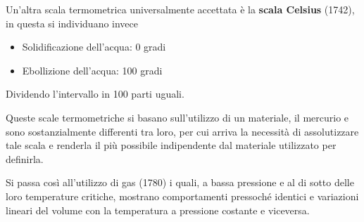 \documentclass[a4paper, 15pt]{article}
\begin{document}
\begin{adjustwidth}{2in}{}
	Un'altra scala termometrica universalmente accettata è la \textbf{scala Celsius} (1742), in questa si individuano invece
	\begin{itemize}
		\item Solidificazione dell'acqua: 0 gradi
		\item Ebollizione dell'acqua: 100 gradi
	\end{itemize}
	Dividendo l'intervallo in 100 parti uguali. \newline
	
	Queste scale termometriche si basano sull'utilizzo di un materiale, il mercurio e sono sostanzialmente differenti tra loro, per cui arriva la necessità di assolutizzare tale scala e renderla il più possibile indipendente dal materiale utilizzato per definirla. 
	
	Si passa così all'utilizzo di gas (1780) i quali, a bassa pressione e al di sotto delle loro temperature critiche, mostrano comportamenti pressoché identici e variazioni lineari del volume con la temperatura a pressione costante e viceversa.
\end{adjustwidth}
\newpage
\end{document}
